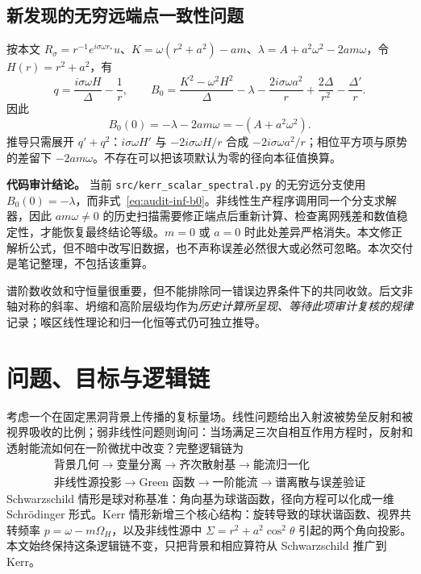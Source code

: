 \documentclass[UTF8,fontset=fandol,11pt,a4paper]{ctexart}
\begin{document}
\subsection{新发现的无穷远端点一致性问题}
按本文 $R_\sigma=r^{-1}e^{i\sigma\omega r_*}u$、$K=\omega(r^2+a^2)-am$、$\lambda=A+a^2\omega^2-2am\omega$，令 $H(r)=r^2+a^2$，有
\begin{equation}
 q=\frac{i\sigma\omega H}{\Delta}-\frac1r,
 \qquad
 B_0=\frac{K^2-\omega^2H^2}{\Delta}-\lambda
       -\frac{2i\sigma\omega a^2}{r}
       +\frac{2\Delta}{r^2}-\frac{\Delta'}r.
\label{eq:audit-exact-b0}
\end{equation}
因此
\begin{equation}
 \boxed{B_0(0)=-\lambda-2am\omega=-(A+a^2\omega^2).}
\label{eq:audit-inf-b0}
\end{equation}
推导只需展开 $q'+q^2$：$i\sigma\omega H'$ 与 $-2i\sigma\omega H/r$ 合成 $-2i\sigma\omega a^2/r$；相位平方项与原势的差留下 $-2am\omega$。不存在可以把该项默认为零的径向本征值换算。

\begin{note}
\textbf{代码审计结论。} 当前 \texttt{src/kerr\_scalar\_spectral.py} 的无穷远分支使用 $B_0(0)=-\lambda$，而非式~\eqref{eq:audit-inf-b0}。非线性生产程序调用同一个分支求解器，因此 $am\omega\ne0$ 的历史扫描需要修正端点后重新计算、检查离网残差和数值稳定性，才能恢复最终结论等级。$m=0$ 或 $a=0$ 时此处差异严格消失。本文修正解析公式，但不暗中改写旧数据，也不声称误差必然很大或必然可忽略。本次交付是笔记整理，不包括该重算。
\end{note}
谱阶数收敛和守恒量很重要，但不能排除同一错误边界条件下的共同收敛。后文非轴对称的斜率、坍缩和高阶层级均作为\emph{历史计算所呈现、等待此项审计复核的规律}记录；喉区线性理论和归一化恒等式仍可独立推导。

\clearpage
\section{问题、目标与逻辑链}

考虑一个在固定黑洞背景上传播的复标量场。线性问题给出入射波被势垒反射和被视界吸收的比例；弱非线性问题则询问：当场满足三次自相互作用方程时，反射和透射能流如何在一阶微扰中改变？完整逻辑链为
\begin{equation}
\boxed{\begin{gathered}
\text{背景几何}\to\text{变量分离}\to\text{齐次散射基}
\to\text{能流归一化}\\
\text{非线性源投影}\to\text{Green 函数}\to\text{一阶能流}
\to\text{谱离散与误差验证}
\end{gathered}}
\end{equation}
Schwarzschild 情形是球对称基准：角向基为球谐函数，径向方程可以化成一维 Schr\"odinger 形式。Kerr 情形新增三个核心结构：旋转导致的球状谐函数、视界共转频率 $p=\omega-m\Omega_H$，以及非线性源中 $\Sigma=r^2+a^2\cos^2\theta$ 引起的两个角向投影。本文始终保持这条逻辑链不变，只把背景和相应算符从 Schwarzschild 推广到 Kerr。
\end{document}
